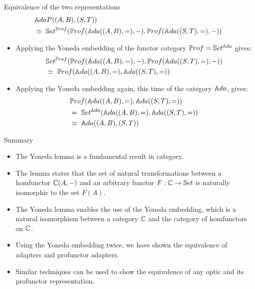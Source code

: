 \begin{frame}[fragile]{Equivalence of the two representations}
	\begin{align*}
		&\mathbb{A}daP ((A,B),(S,T))\\
		&\simeq\ \mathbb{S}et^{{\mathbb{P}rof}}({\mathbb{P}rof}({\mathbb{A}da}((A, B), =), -), {\mathbb{P}rof}({\mathbb{A}da}((S, T), =), -))
	\end{align*}
	\vspace{-16pt}
	\begin{itemize}
		\item Applying the Yoneda embedding of the functor category ${\mathbb{P}rof} = \mathbb{S}et^{{\mathbb{A}da}}$ gives:
		\begin{align*}
			&\mathbb{S}et^{{\mathbb{P}rof}}({\mathbb{P}rof}({\mathbb{A}da}((A, B), =), -), {\mathbb{P}rof}({\mathbb{A}da}((S, T), =), -))\\ 
			&\simeq\  {\mathbb{P}rof}({\mathbb{A}da}((A,B), =), {\mathbb{A}da}((S,T), =))
		\end{align*}
		\item Applying the Yoneda embedding again, this time of the category ${\mathbb{A}da}$, gives:
		\begin{align*}
			&{\mathbb{P}rof}({\mathbb{A}da}((A,B), =), {\mathbb{A}da}((S,T), =))\\
			&=\ \mathbb{S}et^{\mathbb{A}da}({\mathbb{A}da}((A,B), =), {\mathbb{A}da}((S,T), =))\\
			&\simeq\ {\mathbb{A}da}((A,B), (S,T))
		\end{align*}
	\end{itemize}
\end{frame}
\begin{frame}{Summary}
	\begin{itemize}
		\item The Yoneda lemma is a fundamental result in category.
		\pause\item The lemma states that the set of natural transformations between a homfunctor $\mathbb{C}(A, -)$ and an arbitrary functor $F : \mathbb{C} \to \mathbb{S}et$ is naturally isomorphic to the set $F(A)$.
		\pause\item The Yoneda lemma enables the use of the Yoneda embedding, which is a natural isomorphism between a category $\mathbb{C}$ and the category of homfunctors on $\mathbb{C}$.
		\pause\item Using the Yoneda embedding twice, we have shown the equivalence of adapters and profunctor adapters.
		\pause\item Similar techniques can be used to show the equivalence of any optic and its profunctor representation.
	\end{itemize}
\end{frame}